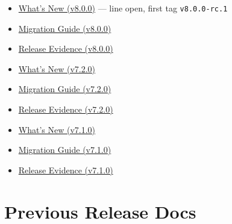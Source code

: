 \begin{itemize}
\tightlist
\item
  \href{https://github.com/flyingrobots/bijou/blob/cbd70612140e7a450d764b3c7be1c6af878b99bc/docs/releases/8.0.0/whats-new.md}{What's New (v8.0.0)} --- line open, first tag \texttt{v\allowbreak{}8\allowbreak{}.\allowbreak{}0\allowbreak{}.\allowbreak{}0\allowbreak{}-\allowbreak{}r\allowbreak{}c\allowbreak{}.\allowbreak{}1}
\item
  \href{https://github.com/flyingrobots/bijou/blob/cbd70612140e7a450d764b3c7be1c6af878b99bc/docs/releases/8.0.0/migration-guide.md}{Migration Guide (v8.0.0)}
\item
  \href{https://github.com/flyingrobots/bijou/blob/cbd70612140e7a450d764b3c7be1c6af878b99bc/docs/releases/8.0.0/README.md}{Release Evidence (v8.0.0)}
\item
  \href{https://github.com/flyingrobots/bijou/blob/cbd70612140e7a450d764b3c7be1c6af878b99bc/docs/releases/7.2.0/whats-new.md}{What's New (v7.2.0)}
\item
  \href{https://github.com/flyingrobots/bijou/blob/cbd70612140e7a450d764b3c7be1c6af878b99bc/docs/releases/7.2.0/migration-guide.md}{Migration Guide (v7.2.0)}
\item
  \href{https://github.com/flyingrobots/bijou/blob/cbd70612140e7a450d764b3c7be1c6af878b99bc/docs/releases/7.2.0/README.md}{Release Evidence (v7.2.0)}
\item
  \href{https://github.com/flyingrobots/bijou/blob/cbd70612140e7a450d764b3c7be1c6af878b99bc/docs/releases/7.1.0/whats-new.md}{What's New (v7.1.0)}
\item
  \href{https://github.com/flyingrobots/bijou/blob/cbd70612140e7a450d764b3c7be1c6af878b99bc/docs/releases/7.1.0/migration-guide.md}{Migration Guide (v7.1.0)}
\item
  \href{https://github.com/flyingrobots/bijou/blob/cbd70612140e7a450d764b3c7be1c6af878b99bc/docs/releases/7.1.0/README.md}{Release Evidence (v7.1.0)}
\end{itemize}

\section{Previous Release Docs}\label{record-263-previous-release-docs}

